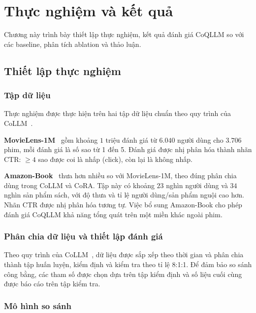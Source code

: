 \chapter{Thực nghiệm và kết quả}
\label{Chapter4}

Chương này trình bày thiết lập thực nghiệm, kết quả đánh giá CoQLLM so với các baseline,
phân tích ablation và thảo luận.

\section{Thiết lập thực nghiệm}
\label{sec:thiet-lap-thuc-nghiem}

\subsection{Tập dữ liệu}
\label{ssec:dataset}

Thực nghiệm được thực hiện trên hai tập dữ liệu chuẩn theo quy trình của
CoLLM~\cite{collm2023}.

\textbf{MovieLens-1M}~\cite{movielens2015} gồm khoảng $1$ triệu đánh giá từ $6{.}040$
người dùng cho $3{.}706$ phim, mỗi đánh giá là số sao từ 1 đến 5. Đánh giá được nhị phân
hóa thành nhãn CTR: $\geq 4$ sao được coi là nhấp (click), còn lại là không nhấp.

\textbf{Amazon-Book}~\cite{cora2024} thưa hơn nhiều so với MovieLens-1M, theo đúng phân chia
dùng trong CoLLM và CoRA. Tập này có khoảng $23$ nghìn người dùng và $34$ nghìn sản phẩm sách,
với độ thưa và tỉ lệ người dùng/sản phẩm nguội cao hơn. Nhãn CTR được nhị phân hóa tương tự.
Việc bổ sung Amazon-Book cho phép đánh giá CoQLLM khả năng tổng quát trên một miền khác ngoài phim.

\subsection{Phân chia dữ liệu và thiết lập đánh giá}
\label{ssec:phan-chia}

Theo quy trình của CoLLM~\cite{collm2023}, dữ liệu được sắp xếp theo thời gian và phân
chia thành tập huấn luyện, kiểm định và kiểm tra theo tỉ lệ 8:1:1. Để đảm bảo so sánh
công bằng, các tham số được chọn dựa trên tập kiểm định và số liệu cuối cùng được
báo cáo trên tập kiểm tra.

\subsection{Mô hình so sánh}
\label{ssec:baseline}

